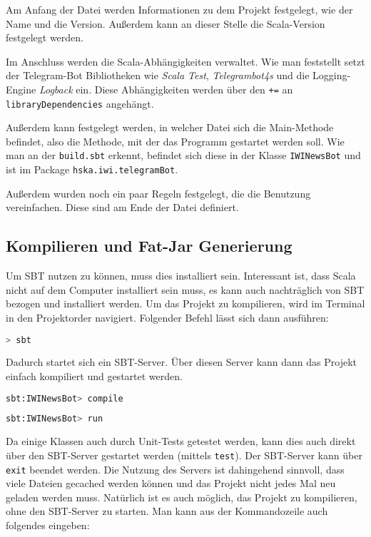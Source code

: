 Am Anfang der Datei werden Informationen zu dem Projekt festgelegt, wie der Name und die Version. Außerdem kann an dieser Stelle die Scala-Version festgelegt werden.

Im Anschluss werden die Scala-Abhängigkeiten verwaltet. Wie man feststellt setzt der Telegram-Bot Bibliotheken wie \emph{Scala Test}, \emph{Telegrambot4s} und die Logging-Engine \emph{Logback} ein. Diese Abhängigkeiten werden über den \texttt{+=} an \texttt{libraryDependencies} angehängt.

Außerdem kann festgelegt werden, in welcher Datei sich die Main-Methode befindet, also die Methode, mit der das Programm gestartet werden soll. Wie man an der \texttt{build.sbt} erkennt, befindet sich diese in der Klasse \texttt{IWINewsBot} und ist im Package \texttt{hska\allowbreak.iwi\allowbreak.telegramBot}.

Außerdem wurden noch ein paar Regeln festgelegt, die die Benutzung vereinfachen. Diese sind am Ende der Datei definiert.

\subsection{Kompilieren und Fat-Jar Generierung}
Um SBT nutzen zu können, muss dies installiert sein. Interessant ist, dass Scala nicht auf dem Computer installiert sein muss, es kann auch nachträglich von SBT bezogen und installiert werden. Um das Projekt zu kompilieren, wird im Terminal in den Projektorder navigiert. Folgender Befehl lässt sich dann ausführen:

\begin{lstlisting}[language=bash]
> sbt
\end{lstlisting}

Dadurch startet sich ein SBT-Server. Über diesen Server kann dann das Projekt einfach kompiliert und gestartet werden.

\begin{lstlisting}[language=bash]
sbt:IWINewsBot> compile
\end{lstlisting}

\begin{lstlisting}[language=bash]
sbt:IWINewsBot> run
\end{lstlisting}

Da einige Klassen auch durch Unit-Tests getestet werden, kann dies auch direkt über den SBT-Server gestartet werden (mittels \texttt{test}). Der SBT-Server kann über \texttt{exit} beendet werden. Die Nutzung des Servers ist dahingehend sinnvoll, dass viele Dateien gecached werden können und das Projekt nicht jedes Mal neu geladen werden muss. Natürlich ist es auch möglich, das Projekt zu kompilieren, ohne den SBT-Server zu starten. Man kann aus der Kommandozeile auch folgendes eingeben:

